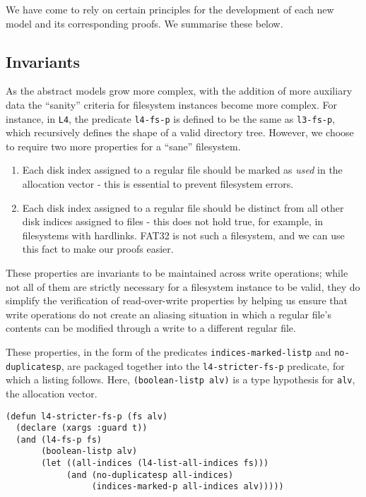\documentclass[submission,copyright,creativecommons]{eptcs}
\begin{document}
We have come to rely on certain principles for the development of each
new model and its corresponding proofs. We summarise these below.

\subsection{Invariants}
\label{subsec:invariants}

As the abstract models grow more complex, with the addition of more
auxiliary data the ``sanity'' criteria for filesystem instances become more
complex. For instance, in \texttt{L4}, the predicate \texttt{l4-fs-p}
is defined to be the same as \texttt{l3-fs-p}, which recursively
defines the shape of a valid directory tree. However, we choose to
require two more properties for a ``sane'' filesystem.

\begin{enumerate}
\item Each disk index assigned to a regular file should be
  marked as \textit{used} in the allocation vector - this is essential
  to prevent filesystem errors.
\item Each disk index assigned to a regular file should be distinct
  from all other disk indices assigned to files - this does not hold
  true, for example, in filesystems with hardlinks. FAT32 is not such
  a filesystem, and we can use this fact to make our proofs easier.
\end{enumerate}

These properties are invariants to be maintained across
write operations; while not all of them are strictly necessary for a
filesystem instance to be valid, they do simplify the verification of
read-over-write properties by helping us ensure that write operations
do not create an aliasing situation in which a regular file's
contents can be modified through a write to a different regular file.

These properties, in the form of the predicates
\texttt{indices-marked-listp} and \texttt{no-duplicatesp}, are
packaged together into the \texttt{l4-stricter-fs-p} predicate, for
which a listing follows. Here, \texttt{(boolean-listp alv)} is a type
hypothesis for \texttt{alv}, the allocation vector.

\medskip

\noindent
\begin{verbatim}
(defun l4-stricter-fs-p (fs alv)
  (declare (xargs :guard t))
  (and (l4-fs-p fs)
       (boolean-listp alv)
       (let ((all-indices (l4-list-all-indices fs)))
            (and (no-duplicatesp all-indices)
                 (indices-marked-p all-indices alv)))))
\end{verbatim}
\end{document}
